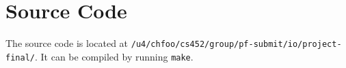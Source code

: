 \documentclass[letterpaper]{article}
\begin{document}
\begin{figure}
\noindent{}
\end{figure}


\section{Source Code%
  \label{source-code}%
}

The source code is located at \texttt{/u4/chfoo/cs452/group/pf-submit/io/project-final/}. It can be compiled by running \texttt{make}.
\end{document}

